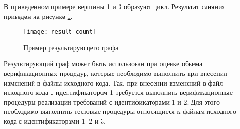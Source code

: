 В приведенном примере вершины 1 и 3 образуют цикл. Результат слияния приведен на рисунке \ref{fig:result_count}.

\begin{figure}[H]
    \centering
    \texttt{[image: result\_count]}
    \caption{Пример результирующего графа}
    \label{fig:result_count}
\end{figure}

Результирующий граф может быть использован при оценке объема верификационных процедур, которые необходимо выполнить при внесении изменений в файлы исходного кода. Так, при внесении изменений в файл исходного кода с идентификатором 1 требуется выполнить верификационные процедуры реализации требований с идентификаторами 1 и 2. Для этого необходимо выполнить тестовые процедуры относящиеся к файлам исходного кода с идентификаторами 1, 2 и 3.